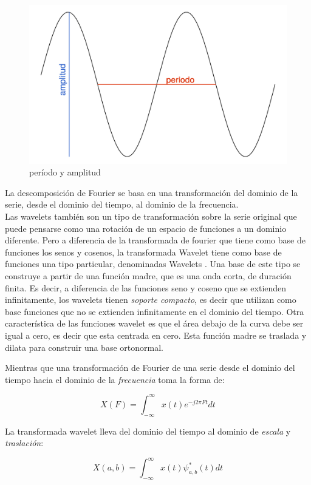 \documentclass[a4paper]{article}
\begin{document}
\begin{figure}[H]
	\centering
	\includegraphics[width=0.65\linewidth]{ciclo.png}
	\caption{período y amplitud} \label{fig:ciclo}
\end{figure}

La descomposición de Fourier se basa en una transformación del dominio de la serie, desde el dominio del tiempo, al dominio de la frecuencia.\\

Las wavelets también son un tipo de transformación sobre la serie original que puede pensarse como una rotación de un espacio de funciones a un dominio diferente. Pero a diferencia de la transformada de fourier que tiene como base de funciones los senos y cosenos, la transformada Wavelet tiene como base de funciones una tipo particular, denominadas Wavelets \cite{castro1995wavelets}. Una base de este tipo se construye a partir de una función madre, que es una onda corta, de duración finita. Es decir, a diferencia de las funciones seno y coseno que se extienden infinitamente, los wavelets tienen \textit{soporte compacto}, es decir que utilizan como base funciones que no se extienden infinitamente en el dominio del tiempo. Otra característica de las funciones wavelet es que el área debajo de la curva debe ser igual a cero, es decir que esta centrada en cero. Esta función madre se traslada y dilata para construir una base ortonormal. 

Mientras que una transformación de Fourier de una serie desde el dominio del tiempo hacia el dominio de la \textit{frecuencia} toma la forma de:

$$
X(F)=\int_{-\infty}^{\infty} x(t) e^{-j2\pi Ft}dt
$$

La transformada wavelet lleva del dominio del tiempo al dominio de \textit{escala} y \textit{traslación}:

$$
X(a,b)=\int_{-\infty}^{\infty} x(t) \psi^*_{a,b}(t)dt
$$
\end{document}
